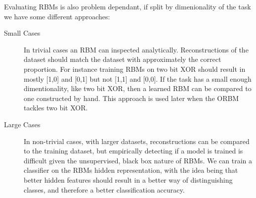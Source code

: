     Evaluating RBMs is also problem dependant, if split by dimenionality of the task we have some different approaches:
    \begin{description}
    \item[Small Cases] In trivial cases an RBM can inspected analytically. Reconstructions of the dataset should match the dataset with approximately the correct proportion. For instance training RBMs on two bit XOR should result in mostly [1,0] and [0,1] but not [1,1] and [0,0].
    If the task has a small enough dimentionality, like two bit XOR, then a learned RBM can be compared to one constructed by hand. This approach is used later when the ORBM tackles two bit XOR.

    \item[Large Cases] In non-trivial cases, with larger datasets, reconstructions can be compared to the training dataset,  but empirically detecting if a model is trained is difficult given the unsupervised, black box nature of RBMs.
    We can train a classifier on the RBMs hidden representation, with the idea being that better hidden features should result in a better way of distinguishing classes, and therefore a better classification accuracy.

  \end{description}
